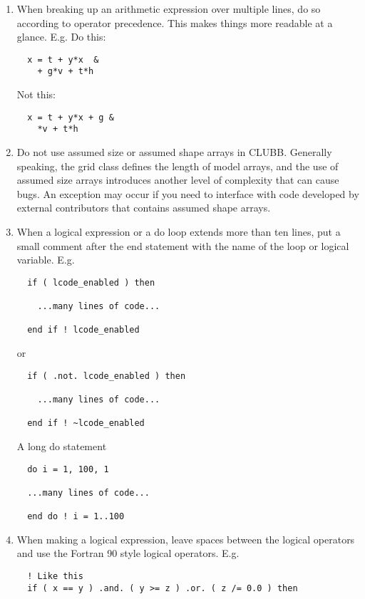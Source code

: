 \documentclass[letterpaper,12pt]{article}
\begin{document}
\begin{enumerate}
\item When breaking up an arithmetic expression over multiple lines, do so according to 
operator precedence.  This makes things more readable at a glance. \newline
E.g. Do this: 
\begin{verbatim}
  x = t + y*x  &
    + g*v + t*h
\end{verbatim}

Not this:
\begin{verbatim}
  x = t + y*x + g &
    *v + t*h
\end{verbatim}

\item Do not use assumed size or assumed shape arrays in CLUBB.  
Generally speaking, the grid class defines the length of model arrays, 
and the use of assumed size arrays introduces 
another level of complexity that can cause bugs.  An exception may occur
if you need to interface with code developed by external contributors that
contains assumed shape arrays.
\newline

\item When a logical expression or a do loop extends more than ten lines, put a
small comment after the end statement with the name of the loop or logical
variable.
E.g. \newline
\begin{verbatim}
  if ( lcode_enabled ) then

    ...many lines of code...

  end if ! lcode_enabled
\end{verbatim}

or 

\begin{verbatim}
  if ( .not. lcode_enabled ) then

    ...many lines of code...

  end if ! ~lcode_enabled
\end{verbatim}

A long do statement

\begin{verbatim}
  do i = 1, 100, 1

  ...many lines of code...

  end do ! i = 1..100
\end{verbatim}

\item When making a logical expression, leave spaces between the 
logical operators and use the Fortran 90 style logical operators. \newline
 E.g.
\begin{verbatim}
  ! Like this
  if ( x == y ) .and. ( y >= z ) .or. ( z /= 0.0 ) then


\end{verbatim}
\end{enumerate}
\end{document}
